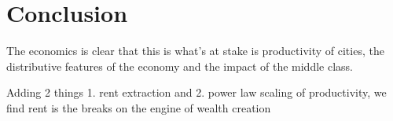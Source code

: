 

\chapter{Conclusion}


The economics is clear that this is what's at stake is productivity of cities, the distributive features of the economy and the impact of the middle class.


Adding 2 things 1. rent extraction and 2. power law scaling of productivity, we find rent is the breaks on the engine of wealth creation


